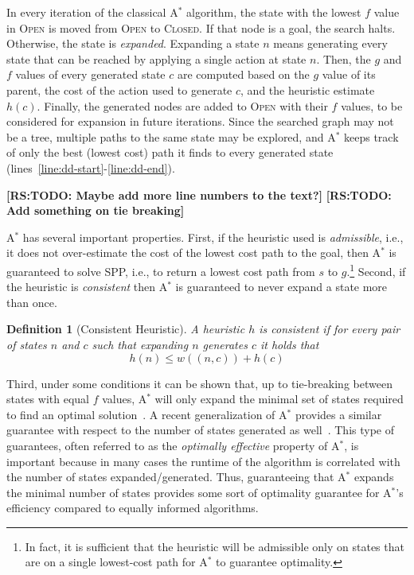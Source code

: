 \documentclass{aicom2e}
\newtheorem{definition}{Definition}
\newcommand{\astar}{A$^*$}
\newcommand{\open}{\textsc{Open}}
\newcommand{\closed}{\textsc{Closed}}
\newcommand{\roni}[1]{\textbf{[RS:#1]}}
\begin{document}
In every iteration of the classical \astar{} algorithm, the state with the lowest $f$ value in \open{} is moved from \open{} to \closed{}. 
If that node is a goal, the search halts. Otherwise, the state is {\em expanded}.  
Expanding a state $n$ means generating every state that can be reached by applying a single action at state $n$. 
Then, the $g$ and $f$ values of every generated state $c$ are computed based on the $g$ value of its parent, the cost of the action used to generate $c$, and the heuristic estimate $h(c)$. Finally, the generated nodes are added to \open{} with their $f$ values, to be considered for expansion in future iterations. Since the searched graph may not be a tree, multiple paths to the same state may be explored, and \astar{} keeps track of only the best (lowest cost) path it finds to every generated state (lines~\ref{line:dd-start}-\ref{line:dd-end}).  


\roni{TODO: Maybe add more line numbers to the text?}
\roni{TODO: Add something on tie breaking}

\astar{} has several important properties. First, if the heuristic used is {\em admissible}, i.e., it does not over-estimate the cost of the lowest cost path to the goal, then \astar{} is guaranteed to solve SPP, i.e., to return a lowest cost path from $s$ to $g$.\footnote{In fact, it is sufficient that the heuristic will be admissible only on states that are on a single lowest-cost path for \astar{} to guarantee optimality.} 
Second, if the heuristic is {\em consistent} then \astar{} is guaranteed to never expand a state more than once. 
\begin{definition}[Consistent Heuristic]
	A heuristic $h$ is consistent if for every pair of states $n$ and $c$ such that expanding $n$ generates $c$ 
	it holds that 
	\[ h(n)\leq w((n,c))+h(c) \]
	\label{def:consistent}
\end{definition}
Third, under some conditions it can be shown that, up to tie-breaking between states with equal $f$ values, \astar{} will only expand the minimal set of states required to find an optimal solution~\cite{dechter1985generalizedBestFirst}. 
A recent generalization of \astar{} provides a similar guarantee with respect to the number of states generated as well~\cite{goldenberg2014enhanced}. This type of guarantees, often referred to as the {\em optimally effective} property of \astar{}, is  important because in many cases the runtime of the algorithm is correlated with the number of states expanded/generated. 
Thus, guaranteeing that \astar{} expands the minimal number of states provides some sort of optimality guarantee for \astar{}'s efficiency compared to equally informed algorithms. 
\end{document}
